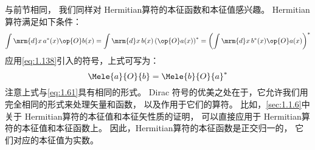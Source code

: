 与前节相同，
我们同样对 Hermitian算符的本征函数和本征值感兴趣。
Hermitian算符满足如下条件：
\begin{equation}
 \int\mrm{d}x\,a^\ast(x)\op{O}b(x) = \int\mrm{d}x\,b(x)\left(\op{O}a(x)\right)^\ast = \left(\int\mrm{d}x\,b^\ast(x)\op{O}a(x)\right)^\ast
 \label{eq:1.139}
\end{equation}
应用\autoref{eq:1.138}引入的符号，上式可写为：
\begin{equation}
 \Mele{a}{O}{b} = {\Mele{b}{O}{a}}^\ast
 \label{eq:1.140}
\end{equation}
注意上式与\autoref{eq:1.61}具有相同的形式。
Dirac 符号的优美之处在于，它允许我们用完全相同的形式来处理矢量和函数，
以及作用于它们的算符。
比如，\autoref{sec:1.1.6}中关于 Hermitian算符的本征值和本征矢性质的证明，
可以直接应用于 Hermitian算符的本征值和本征函数上。
因此，Hermitian算符的本征函数是正交归一的，
它们对应的本征值为实数。


